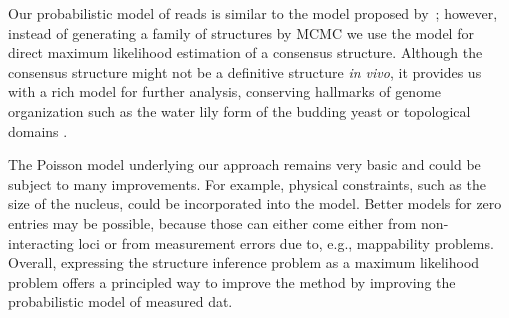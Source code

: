 Our probabilistic model of reads is similar to the model proposed
by~\citet{hu:bayesian}; however, instead of generating a family of structures
by MCMC we use the model for direct maximum likelihood estimation of a
consensus structure. Although the consensus structure might not be a
definitive structure {\em in vivo}, it provides us with a rich model for
further analysis, conserving hallmarks of genome organization such as the
water lily form of the budding yeast \citep{duan:three} or topological domains
\citep{kalhor:genome}.

The Poisson model underlying our approach remains very basic and could be
subject to many improvements.  For example, physical constraints, such as the
size of the nucleus, could be incorporated into the model. Better models for
zero entries may be possible, because those can either come either from
non-interacting loci or from measurement errors due to, e.g., mappability
problems. Overall, expressing the structure inference problem as a maximum
likelihood problem offers a principled way to improve the method by improving
the probabilistic model of measured dat.
